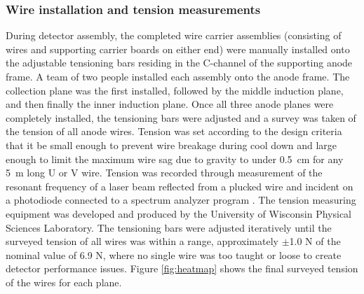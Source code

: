 

\subsubsection{Wire installation and tension measurements}
During detector assembly, the completed wire carrier assemblies (consisting of wires and supporting carrier boards on either end) were manually installed onto the adjustable tensioning bars residing in the C-channel of the supporting anode frame.  A team of two people installed each assembly onto the anode frame.  The collection plane was the first installed, followed by the middle induction plane, and then finally the inner induction plane.  Once all three anode planes were completely installed, the tensioning bars were adjusted and a survey was taken of the tension of all anode wires.  Tension was set according to the design criteria that it be small enough to prevent wire breakage during cool down and large enough to limit the maximum wire sag due to gravity to under 0.5~cm for any 5~m long U or V wire.   Tension was recorded through measurement of the resonant frequency of a laser beam reflected from a plucked wire and incident on a photodiode connected to a spectrum analyzer program \cite{SpectrumLaboratory}.  The tension measuring equipment was developed and produced by the University of Wisconsin Physical Sciences Laboratory.  The tensioning bars were adjusted iteratively until the surveyed tension of all wires was within a range, approximately $\pm$1.0 N of the nominal value of 6.9 N, where no single wire was too taught or loose to create detector performance issues.  Figure \ref{fig:heatmap} shows the final surveyed tension of the wires for each plane.

